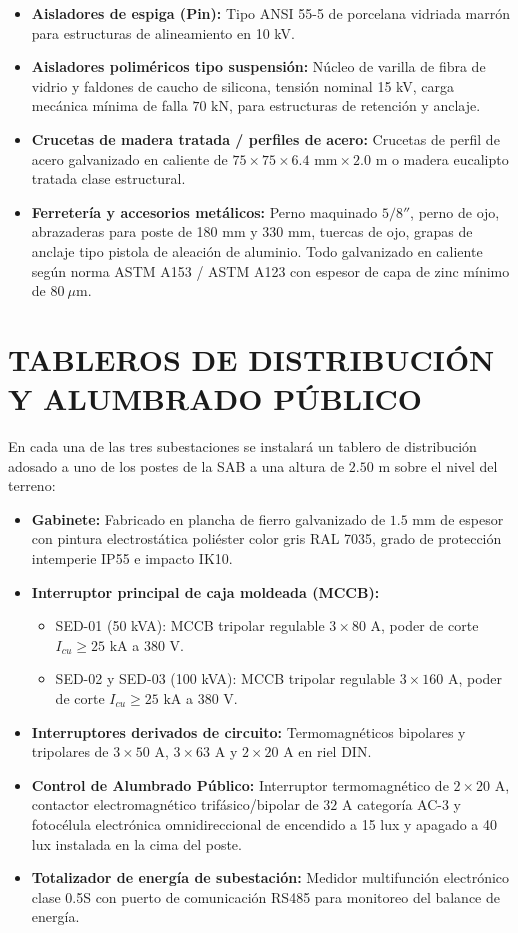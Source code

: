 \begin{itemize}
  \item \textbf{Aisladores de espiga (Pin):} Tipo ANSI 55-5 de porcelana vidriada marrón para estructuras de alineamiento en 10 kV.
  \item \textbf{Aisladores poliméricos tipo suspensión:} Núcleo de varilla de fibra de vidrio y faldones de caucho de silicona, tensión nominal 15 kV, carga mecánica mínima de falla $70\text{ kN}$, para estructuras de retención y anclaje.
  \item \textbf{Crucetas de madera tratada / perfiles de acero:} Crucetas de perfil de acero galvanizado en caliente de $75 \times 75 \times 6.4\text{ mm} \times 2.0\text{ m}$ o madera eucalipto tratada clase estructural.
  \item \textbf{Ferretería y accesorios metálicos:} Perno maquinado $5/8''$, perno de ojo, abrazaderas para poste de 180 mm y 330 mm, tuercas de ojo, grapas de anclaje tipo pistola de aleación de aluminio. Todo galvanizado en caliente según norma ASTM A153 / ASTM A123 con espesor de capa de zinc mínimo de $80\ \mu\text{m}$.
\end{itemize}

\section{TABLEROS DE DISTRIBUCIÓN Y ALUMBRADO PÚBLICO}

En cada una de las tres subestaciones se instalará un tablero de distribución adosado a uno de los postes de la SAB a una altura de $2.50\text{ m}$ sobre el nivel del terreno:
\begin{itemize}
  \item \textbf{Gabinete:} Fabricado en plancha de fierro galvanizado de $1.5\text{ mm}$ de espesor con pintura electrostática poliéster color gris RAL 7035, grado de protección intemperie IP55 e impacto IK10.
  \item \textbf{Interruptor principal de caja moldeada (MCCB):}
    \begin{itemize}
      \item SED-01 (50 kVA): MCCB tripolar regulable $3 \times 80\text{ A}$, poder de corte $I_{cu} \ge 25\text{ kA}$ a 380 V.
      \item SED-02 y SED-03 (100 kVA): MCCB tripolar regulable $3 \times 160\text{ A}$, poder de corte $I_{cu} \ge 25\text{ kA}$ a 380 V.
    \end{itemize}
  \item \textbf{Interruptores derivados de circuito:} Termomagnéticos bipolares y tripolares de $3 \times 50\text{ A}$, $3 \times 63\text{ A}$ y $2 \times 20\text{ A}$ en riel DIN.
  \item \textbf{Control de Alumbrado Público:} Interruptor termomagnético de $2 \times 20\text{ A}$, contactor electromagnético trifásico/bipolar de $32\text{ A}$ categoría AC-3 y fotocélula electrónica omnidireccional de encendido a 15 lux y apagado a 40 lux instalada en la cima del poste.
  \item \textbf{Totalizador de energía de subestación:} Medidor multifunción electrónico clase 0.5S con puerto de comunicación RS485 para monitoreo del balance de energía.
\end{itemize}

